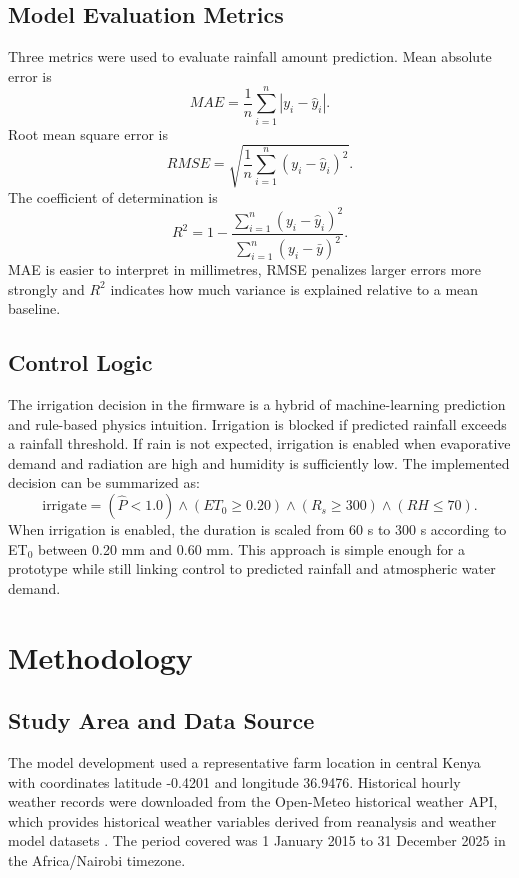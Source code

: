 \documentclass[12pt,a4paper]{report}
\begin{document}
\section{Model Evaluation Metrics}
Three metrics were used to evaluate rainfall amount prediction. Mean absolute error is
\begin{equation}
	MAE = \frac{1}{n}\sum_{i=1}^{n}|y_i-\hat{y}_i|.
\end{equation}
Root mean square error is
\begin{equation}
	RMSE = \sqrt{\frac{1}{n}\sum_{i=1}^{n}(y_i-\hat{y}_i)^2}.
\end{equation}
The coefficient of determination is
\begin{equation}
	R^2 = 1-\frac{\sum_{i=1}^{n}(y_i-\hat{y}_i)^2}{\sum_{i=1}^{n}(y_i-\bar{y})^2}.
\end{equation}
MAE is easier to interpret in millimetres, RMSE penalizes larger errors more strongly and $R^2$ indicates how much variance is explained relative to a mean baseline.

\section{Control Logic}
The irrigation decision in the firmware is a hybrid of machine-learning prediction and rule-based physics intuition. Irrigation is blocked if predicted rainfall exceeds a rainfall threshold. If rain is not expected, irrigation is enabled when evaporative demand and radiation are high and humidity is sufficiently low. The implemented decision can be summarized as:
\begin{equation}
	\text{irrigate} =
	(\hat{P} < 1.0)\land(ET_0 \geq 0.20)\land(R_s \geq 300)\land(RH \leq 70).
\end{equation}
When irrigation is enabled, the duration is scaled from 60 s to 300 s according to ET$_0$ between 0.20 mm and 0.60 mm. This approach is simple enough for a prototype while still linking control to predicted rainfall and atmospheric water demand.

\chapter{Methodology}

\section{Study Area and Data Source}
The model development used a representative farm location in central Kenya with coordinates latitude -0.4201 and longitude 36.9476. Historical hourly weather records were downloaded from the Open-Meteo historical weather API, which provides historical weather variables derived from reanalysis and weather model datasets \citep{openmeteo2026historical}. The period covered was 1 January 2015 to 31 December 2025 in the Africa/Nairobi timezone.
\end{document}
